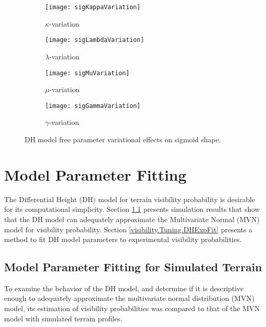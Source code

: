 \begin{figure} [!h]
	\centering
	\begin{subfigure}[b]{0.48\textwidth}
                \texttt{[image: sigKappaVariation]}
                \caption{$\kappa$-variation}
                \label{}
	\end{subfigure}
  	\centering
	\begin{subfigure}[b]{0.48\textwidth}
                \texttt{[image: sigLambdaVariation]}
		\caption{$\lambda$-variation}
		\label{}
  	\end{subfigure}
  	\begin{subfigure}[b]{0.48\textwidth}
                \texttt{[image: sigMuVariation]}
		\caption{$\mu$-variation}
		\label{}
  	\end{subfigure}
  	\begin{subfigure}[b]{0.48\textwidth}
                \texttt{[image: sigGammaVariation]}
		\caption{$\gamma$-variation}
		\label{}
  	\end{subfigure}
	\caption{DH model free parameter variational effects on sigmoid shape.}
	\label{fig:sigVariation}
\end{figure}

\section{Model Parameter Fitting}
\label{visibility.Tuning}

The Differential Height (DH) model for terrain visibility probability is desirable for its computational simplicity.  
Section \ref{visibility.Tuning.DHMVNfit} presents simulation results that show that the DH model can adequately approximate the Multivariate Normal (MVN) model for visibility probability.  
Section \ref{visibility.Tuning.DHExpFit} presents a method to fit DH model parameters to experimental visibility probabilities.

\subsection{Model Parameter Fitting for Simulated Terrain}
\label{visibility.Tuning.DHMVNfit}

To examine the behavior of the DH model, and determine if it is descriptive enough to adequately approximate the multivariate normal distribution (MVN) model, its estimation of visibility probabilities was compared to that of the MVN model with simulated terrain profiles. 

